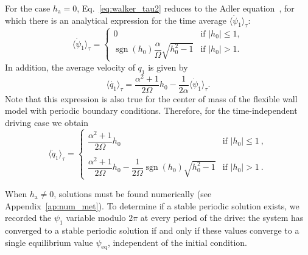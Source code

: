\documentclass[prb,aps,twocolumn,superscriptaddress,floatfix]{revtex4-2}
\begin{document}
For the case $h_\text{a}=0$, Eq.~\eqref{eq:walker_tau2} reduces to the Adler equation~\cite{adler1946study}, for which there is an analytical expression for the time average $\langle\dot\psi_1\rangle_\tau$:
\begin{equation}
    \langle\dot \psi_1 \rangle_\tau  = \begin{cases} 
0 & \text{if } \left| h_0\right| \leq 1, \\ 
\operatorname{sgn}(h_0)\dfrac{\alpha}{\Omega} \sqrt{h_0^2 - 1} & \text{if }\left| h_0\right| >1.
\end{cases}
    \label{eq:avg_walker}
\end{equation}
In addition, the average velocity of $q_{1}$ is given by
\begin{equation}
    \langle \dot{q_{1}} \rangle_{\tau} = \frac{\alpha^{2}+1}{2\Omega}h_{0} - \frac{1}{2\alpha}\langle\dot \psi_1\rangle_{\tau}.
    \label{eq:dot_q1_avg}
\end{equation}
Note that this expression is also true for the center of mass of the flexible wall model with periodic boundary conditions. Therefore, for the time-independent driving case we obtain
\begin{equation}
    \langle\dot q_1 \rangle_\tau  =
    \begin{cases} 
     \dfrac{\alpha^{2}+1}{2\Omega}h_{0} & \text{if } \left| h_0\right| \leq 1 \ , \\ \\
    \dfrac{\alpha^{2}+1}{2\Omega}h_{0}-\dfrac{1}{2\Omega}\operatorname{sgn}(h_0) \sqrt{h_0^2 - 1} & \text{if }\left| h_0\right| >1 \ .
    \end{cases}
    \label{eq:avg_q1_cases}
\end{equation}

When $h_\text{a}\neq0$, solutions must be found numerically (see Appendix~\ref{ap:num_met}). To determine if a stable periodic solution exists, we recorded the $\psi_1$ variable modulo $2\pi$ at every period of the drive: the system has converged to a stable periodic solution if and only if these values converge to a single equilibrium value $\psi_\text{eq}$, independent of the initial condition.
\end{document}
